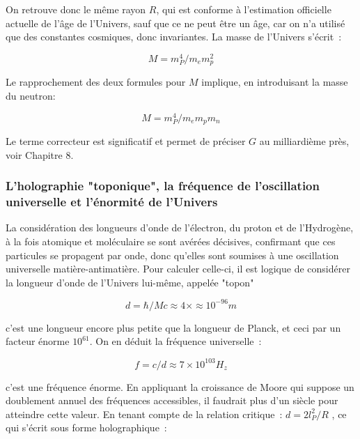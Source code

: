 \documentclass[a4paper,12pt]{article}
\begin{document}
On retrouve donc le même rayon $R$, qui est conforme à l'estimation officielle actuelle de l'âge de l'Univers, sauf que ce ne peut être un âge, car on n'a utilisé que des constantes cosmiques, donc invariantes. La masse de l'Univers s'écrit :

\begin{equation}
M = m_P^4/m_em_p^2
\end{equation}

Le rapprochement des deux formules pour $M$ implique, en introduisant la masse du neutron:

\begin{equation}
M = m_P^4/m_em_pm_n
\end{equation}

 
Le terme correcteur est significatif et permet de préciser $G$ au milliardième près, voir Chapitre 8.
 


\subsubsection {L'holographie "toponique", la fréquence de l'oscillation universelle et l'énormité de l'Univers}

       La considération des longueurs d'onde de l'électron, du proton et de l'Hydrogène, à la fois atomique et moléculaire se sont avérées décisives, confirmant que ces particules se propagent par onde, donc qu'elles sont soumises à une oscillation universelle matière-antimatière. Pour calculer celle-ci, il est logique de considérer la longueur d'onde de l'Univers lui-même, appelée "topon" 


\begin{equation}
d = \hbar/Mc  \approx 4\times \approx 10^{-96} m 
\end{equation}


c'est une longueur encore plus petite que la longueur de Planck, et ceci par un facteur énorme $10^{61}$. On en déduit la fréquence universelle : 


\begin{equation}
f = c/d \approx  7 \times 10^{103} H_z
\end{equation}

c'est une fréquence énorme. En appliquant la croissance de Moore qui suppose un doublement annuel des fréquences accessibles, il faudrait plus d'un siècle pour atteindre cette valeur.
     En tenant compte de la relation critique : $d = 2l_P^2/R$ , ce qui s'écrit sous forme holographique :
\end{document}
